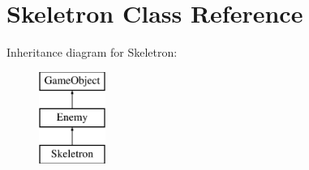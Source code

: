 \hypertarget{class_skeletron}{}\section{Skeletron Class Reference}
\label{class_skeletron}
Inheritance diagram for Skeletron\+:\begin{figure}[H]
\begin{center}
\leavevmode
\includegraphics[height=3.000000cm]{class_skeletron}
\end{center}
\end{figure}

